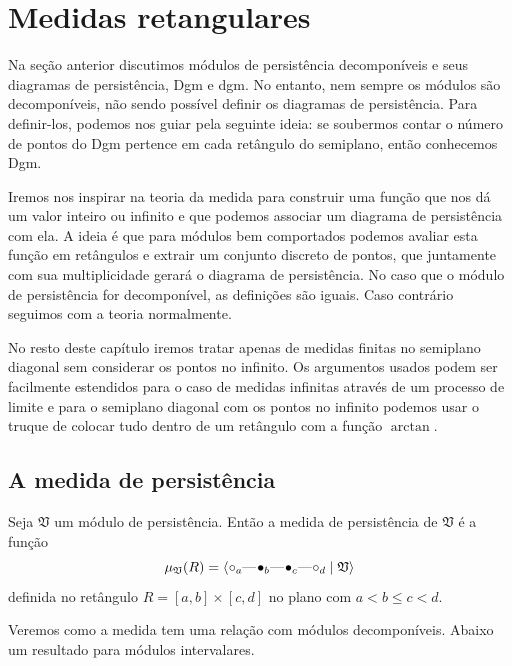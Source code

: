\section{Medidas retangulares}
Na seção anterior discutimos módulos de persistência decomponíveis e seus diagramas de persistência,
Dgm e dgm. No entanto, nem sempre os módulos são decomponíveis, não sendo possível definir os 
diagramas de persistência. Para definir-los, podemos nos guiar pela seguinte ideia: se soubermos 
contar o número de pontos do Dgm pertence em cada retângulo do semiplano, então conhecemos Dgm.

Iremos nos inspirar na teoria da medida para construir uma função que nos dá um valor inteiro ou 
infinito e que podemos associar um diagrama de persistência com ela. A ideia é que para módulos 
bem comportados podemos avaliar esta função em retângulos e extrair um conjunto discreto de pontos,
que juntamente com sua multiplicidade gerará o diagrama de persistência. No caso que o módulo de 
persistência for decomponível, as definições são iguais. Caso contrário seguimos com a teoria 
normalmente. 

No resto deste capítulo iremos tratar apenas de medidas finitas no semiplano diagonal sem considerar
os pontos no infinito. Os argumentos usados podem ser facilmente estendidos para o caso de medidas
infinitas através de um processo de limite e para o semiplano diagonal com os pontos no infinito 
podemos usar o truque de colocar tudo dentro de um retângulo com a função $\arctan$.
 
\subsection{A medida de persistência}

\begin{defi} 
    Seja $\mathfrak{V}$ um módulo de persistência. Então a medida de persistência de $\mathfrak{V}$ é a função
    \begin{equation*}
        \mu_{\mathfrak{V}}(R) = \innerproduct{\qoff{a} \qem \qon{b} \qem \qon{c} \qem \qoff{d} \mid \mathfrak{V}}
    \end{equation*}
    definida no retângulo $R = [a,b]\times[c,d]$ no plano com $a < b \leq c < d$. 
\end{defi}

Veremos como a medida tem uma relação com módulos decomponíveis. Abaixo um resultado para módulos intervalares.

